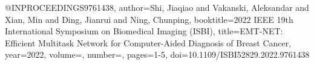 @INPROCEEDINGS{9761438,
  author={Shi, Jiaqiao and Vakanski, Aleksandar and Xian, Min and Ding, Jianrui and Ning, Chunping},
  booktitle={2022 IEEE 19th International Symposium on Biomedical Imaging (ISBI)}, 
  title={EMT-NET: Efficient Multitask Network for Computer-Aided Diagnosis of Breast Cancer}, 
  year={2022},
  volume={},
  number={},
  pages={1-5},
  doi={10.1109/ISBI52829.2022.9761438}}